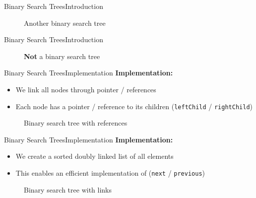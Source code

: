 
\begin{frame}{Binary Search Trees}{Introduction}
  \begin{figure}
    
    \caption{Another binary search tree}
    \label{fig:binary_search_trees:binary_tree_example2}
  \end{figure}
\end{frame}


\begin{frame}{Binary Search Trees}{Introduction}
  \begin{figure}
    
    \caption{\textbf{Not} a binary search tree}
    \label{fig:binary_search_trees:binary_tree_example3}
  \end{figure}
\end{frame}


\begin{frame}{Binary Search Trees}{Implementation}
  \textbf{Implementation:}
  \begin{itemize}
    \item
      We link all nodes through pointer / references
    \item
      Each node has a pointer / reference to its children
      (\texttt{\color{Mittel-Blau}leftChild} /
      \texttt{\color{Mittel-Blau}rightChild})
  \end{itemize}
  \begin{figure}
    
    \caption{Binary search tree with references}
    \label{fig:binary_search_trees:binary_tree_impl1}
  \end{figure}
\end{frame}


\begin{frame}{Binary Search Trees}{Implementation}
  \textbf{Implementation:}
  \begin{itemize}
    \item
      We create a sorted doubly linked list of all elements
    \item
      This enables an efficient implementation of
      (\texttt{\color{Mittel-Blau}next} /
      \texttt{\color{Mittel-Blau}previous})
  \end{itemize}
  \begin{figure}
    
    \caption{Binary search tree with links}
    \label{fig:binary_search_trees:binary_tree_impl2}
  \end{figure}
\end{frame}

